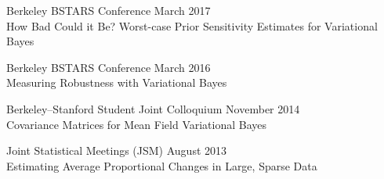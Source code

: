
Berkeley BSTARS Conference \hfill March 2017\\
How Bad Could it Be?  Worst-case Prior Sensitivity Estimates for Variational Bayes


Berkeley BSTARS Conference \hfill March 2016\\
Measuring Robustness with Variational Bayes

Berkeley--Stanford Student Joint Colloquium \hfill November 2014\\
Covariance Matrices for Mean Field Variational Bayes

Joint Statistical Meetings (JSM) \hfill August 2013\\
Estimating Average Proportional Changes in Large, Sparse Data
